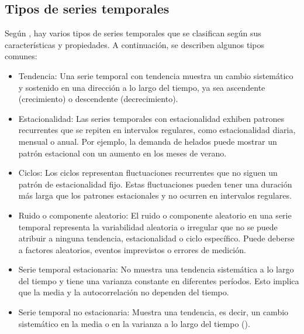 \subsection{Tipos de series temporales}
Según \cite{ocampo2004pronostico}, hay varios tipos de series temporales que se clasifican según sus características y propiedades. A continuación, se describen algunos tipos comunes:
\begin{itemize}
	\item Tendencia: Una serie temporal con tendencia muestra un cambio sistemático y sostenido en una dirección a lo largo del tiempo, ya sea ascendente (crecimiento) o descendente (decrecimiento).
	\item Estacionalidad: Las series temporales con estacionalidad exhiben patrones recurrentes que se repiten en intervalos regulares, como estacionalidad diaria, mensual o anual. Por ejemplo, la demanda de helados puede mostrar un patrón estacional con un aumento en los meses de verano.
	\item Ciclos: Los ciclos representan fluctuaciones recurrentes que no siguen un patrón de estacionalidad fijo. Estas fluctuaciones pueden tener una duración más larga que los patrones estacionales y no ocurren en intervalos regulares.
	\item Ruido o componente aleatorio: El ruido o componente aleatorio en una serie temporal representa la variabilidad aleatoria o irregular que no se puede atribuir a ninguna tendencia, estacionalidad o ciclo específico. Puede deberse a factores aleatorios, eventos imprevistos o errores de medición.
	\item Serie temporal estacionaria: No muestra una tendencia sistemática a lo largo del tiempo y tiene una varianza constante en diferentes períodos. Esto implica que la media y la autocorrelación no dependen del tiempo.
	\item Serie temporal no estacionaria: Muestra una tendencia, es decir, un cambio sistemático en la media o en la varianza a lo largo del tiempo  (\cite{ocampo2004pronostico}). 
\end{itemize}

